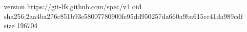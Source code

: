 version https://git-lfs.github.com/spec/v1
oid sha256:2aa4ba276c851b93c58007780900fe95dd950257da660a9ba615cc41da989cdf
size 196704
